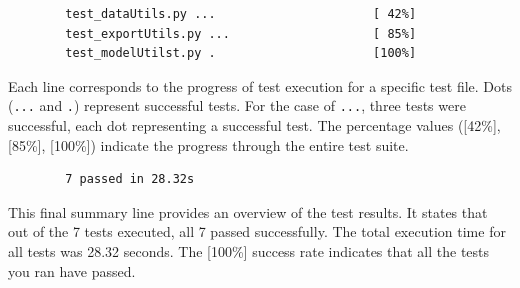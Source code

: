 	\begin{verbatim}
		test_dataUtils.py ...                      [ 42%]
		test_exportUtils.py ...                    [ 85%]
		test_modelUtilst.py .                      [100%]
	\end{verbatim}
	
	Each line corresponds to the progress of test execution for a specific test file. Dots (\texttt{...} and \texttt{.}) represent successful tests. For the case of \texttt{...}, three tests were successful, each dot representing a successful test. The percentage values ([42\%], [85\%], [100\%]) indicate the progress through the entire test suite.
	
	\begin{verbatim}
		7 passed in 28.32s 
	\end{verbatim}
	
	This final summary line provides an overview of the test results. It states that out of the 7 tests executed, all 7 passed successfully. The total execution time for all tests was 28.32 seconds. The [100\%] success rate indicates that all the tests you ran have passed.